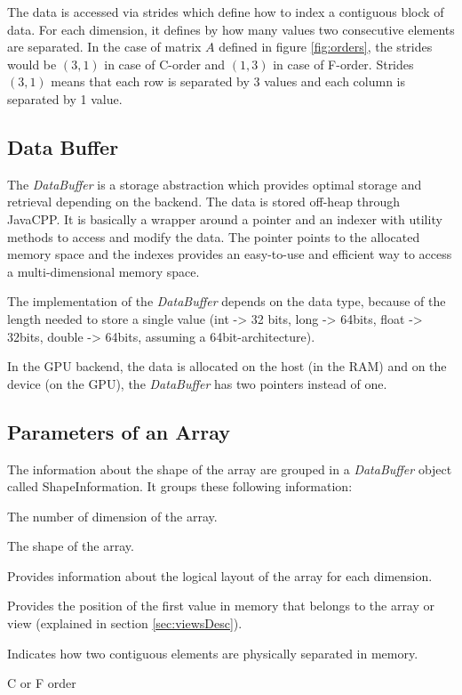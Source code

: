 The data is accessed via strides which define how to index a contiguous block of data. For each dimension, it defines by how many values two consecutive elements are separated. In the case of matrix $A$ defined in figure \ref{fig:orders}, the strides would be $(3, 1)$ in case of C-order and $(1, 3)$ in case of F-order. Strides $(3, 1)$ means that each row is separated by 3 values and each column is separated by 1 value.

\subsection{Data Buffer}
The \textit{DataBuffer} is a storage abstraction which provides optimal storage and retrieval depending on the backend. The data is stored off-heap through JavaCPP. It is basically a wrapper around a pointer and an indexer with utility methods to access and modify the data. 
The pointer points to the allocated memory space and the indexes provides an easy-to-use and efficient way to access a multi-dimensional memory space.

The implementation of the \textit{DataBuffer} depends on the data type, because of the length needed to store a single value (int -> 32 bits, long -> 64bits, float -> 32bits, double -> 64bits, assuming a 64bit-architecture).

In the GPU backend, the data is allocated on the host (in the RAM) and on the device (on the GPU), the \textit{DataBuffer} has two pointers instead of one.

\subsection{Parameters of an Array}
The information about the shape of the array are grouped in a \textit{DataBuffer} object called ShapeInformation. It groups these following information:

\begin{description}[leftmargin=!,labelwidth=\widthof{\bfseries ElementWiseStride}]
	\item [Rank] The number of dimension of the array.
	\item [Shape] The shape of the array.
	\item [Strides] Provides information about the logical layout of the array for each dimension.
	\item [Offset] Provides the position of the first value in memory that belongs to the array or view (explained in section \ref{sec:viewsDesc}).
	\item [ElementWiseStride] Indicates how two contiguous elements are physically separated in memory.
	\item[Order] C or F order
\end{description}


